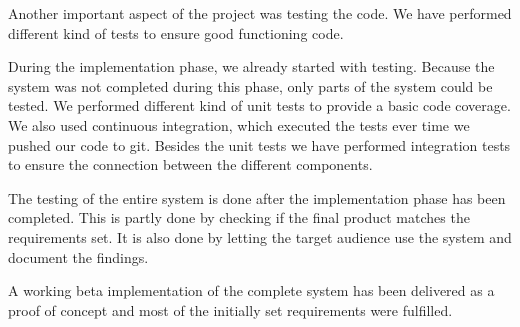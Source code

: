 Another important aspect of the project was testing the code.
We have performed different kind of tests to ensure good functioning code.

During the implementation phase, we already started with testing. Because the system was not completed during this phase, only parts of the system could be tested.
We performed different kind of unit tests to provide a basic code coverage.
We also used continuous integration, which executed the tests ever time we pushed our code to git.
Besides the unit tests we have performed integration tests to ensure the connection between the different components.

The testing of the entire system is done after the implementation phase has been completed. This is partly done by checking if the final product matches the requirements set. It is also done by letting the target audience use the system and document the findings.

A working beta implementation of the complete system has been delivered as a proof of concept and most of the initially set requirements were fulfilled.
